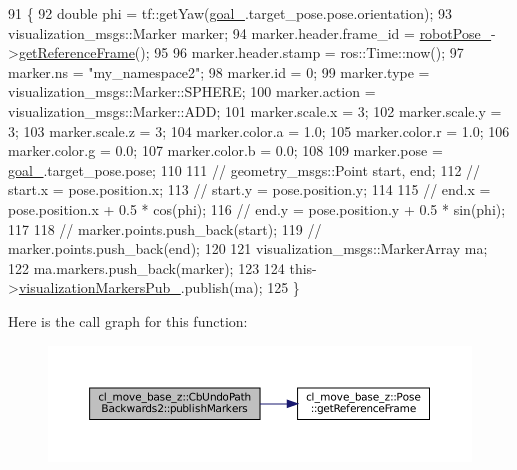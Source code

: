 \begin{DoxyCode}
91 \{
92   \textcolor{keywordtype}{double} phi = tf::getYaw(\hyperlink{classcl__move__base__z_1_1CbUndoPathBackwards2_ad119c38ee9cb341c9b468682d1794538}{goal\_}.target\_pose.pose.orientation);
93   visualization\_msgs::Marker marker;
94   marker.header.frame\_id = \hyperlink{classcl__move__base__z_1_1CbUndoPathBackwards2_a2d398dac07efaca840fbcea31957cf7a}{robotPose\_}->\hyperlink{classcl__move__base__z_1_1Pose_af8c2dc151e74aa8da6b283d1c8563051}{getReferenceFrame}();
95 
96   marker.header.stamp = ros::Time::now();
97   marker.ns = \textcolor{stringliteral}{"my\_namespace2"};
98   marker.id = 0;
99   marker.type = visualization\_msgs::Marker::SPHERE;
100   marker.action = visualization\_msgs::Marker::ADD;
101   marker.scale.x = 3;
102   marker.scale.y = 3;
103   marker.scale.z = 3;
104   marker.color.a = 1.0;
105   marker.color.r = 1.0;
106   marker.color.g = 0.0;
107   marker.color.b = 0.0;
108 
109   marker.pose = \hyperlink{classcl__move__base__z_1_1CbUndoPathBackwards2_ad119c38ee9cb341c9b468682d1794538}{goal\_}.target\_pose.pose;
110 
111   \textcolor{comment}{// geometry\_msgs::Point start, end;}
112   \textcolor{comment}{// start.x = pose.position.x;}
113   \textcolor{comment}{// start.y = pose.position.y;}
114 
115   \textcolor{comment}{// end.x = pose.position.x + 0.5 * cos(phi);}
116   \textcolor{comment}{// end.y = pose.position.y + 0.5 * sin(phi);}
117 
118   \textcolor{comment}{// marker.points.push\_back(start);}
119   \textcolor{comment}{// marker.points.push\_back(end);}
120 
121   visualization\_msgs::MarkerArray ma;
122   ma.markers.push\_back(marker);
123 
124   this->\hyperlink{classcl__move__base__z_1_1CbMoveBaseClientBehaviorBase_aff48fc567ae025b196efd8895b7fb35d}{visualizationMarkersPub\_}.publish(ma);
125 \}
\end{DoxyCode}
Here is the call graph for this function\+:
\nopagebreak
\begin{figure}[H]
\begin{center}
\leavevmode
\includegraphics[width=350pt]{classcl__move__base__z_1_1CbUndoPathBackwards2_afaa039c78eb70ba012d86d8c77b9828c_cgraph}
\end{center}
\end{figure}
\mbox{\label{classcl__move__base__z_1_1CbUndoPathBackwards2_a62f0d53fc341ca6d241637cc0e4b2e30}} 
